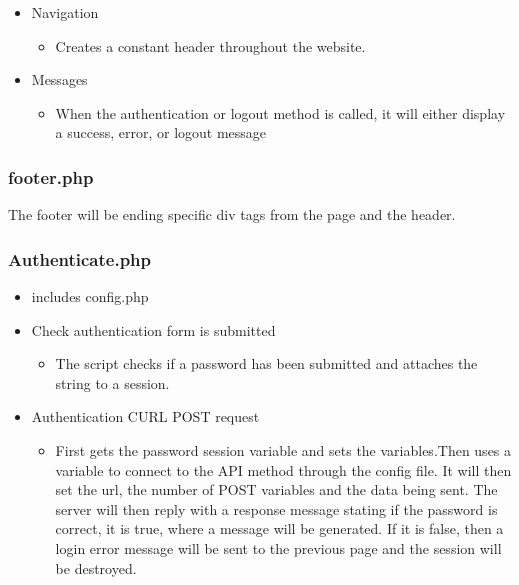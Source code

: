 \begin{itemize}
            \item Navigation
            \begin{itemize}
                \item Creates a constant header throughout the website.
            \end{itemize}
            \item Messages
            \begin{itemize}
                \item When the authentication or logout method is called, it will either display a success, error, or logout message 
            \end{itemize}
        \end{itemize}

    \subsubsection{footer.php}
        The footer will be ending specific div tags from the page and the header.

    \subsubsection{Authenticate.php}
        \begin{itemize}
            \item includes config.php 
            \item Check authentication form is submitted
            \begin{itemize}
                \item The script checks if a password has been submitted and attaches the string to a session.
            \end{itemize}
            \item Authentication CURL POST request
            \begin{itemize}
                \item First gets the password session variable and sets the variables.Then uses a variable to connect to the API method through the config file. It will then set the url, the number of POST variables and the data being sent. The server will then reply with a response message stating if the password is correct, it is true, where a message will be generated. If it is false, then a login error message will be sent to the previous page and the session will be destroyed.
            \end{itemize}
        \end{itemize}


